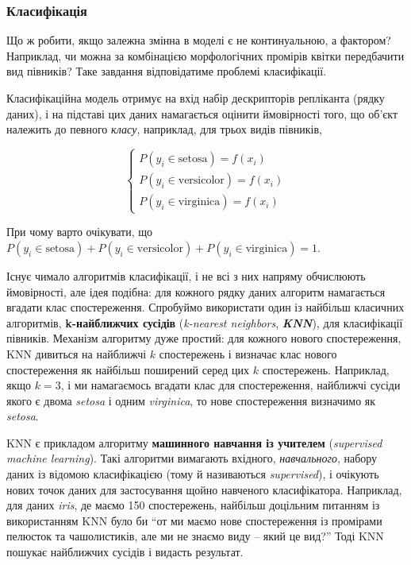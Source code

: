 \documentclass[
  11pt,
]{book}
\begin{document}
\subsubsection{Класифікація}\label{ux43aux43bux430ux441ux438ux444ux456ux43aux430ux446ux456ux44f}

Що ж робити, якщо залежна змінна в моделі є не континуальною, а фактором? Наприклад, чи можна за комбінацією морфологічних промірів квітки передбачити вид півників? Таке завдання відповідатиме проблемі класифікації.

Класифікаційна модель отримує на вхід набір дескрипторів репліканта (рядку даних), і на підставі цих даних намагається оцінити ймовірності того, що об'єкт належить до певного \emph{класу}, наприклад, для трьох видів півників,

\[
\begin{cases}
    P(y_i \in \text{setosa}) = f(x_i) \\
    P(y_i \in \text{versicolor}) = f(x_i) \\
    P(y_i \in \text{virginica}) = f(x_i)
\end{cases}
\]

При чому варто очікувати, що \(P(y_i \in \text{setosa}) + P(y_i \in \text{versicolor}) + P(y_i \in \text{virginica}) = 1\).

Існує чимало алгоритмів класифікації, і не всі з них напряму обчислюють ймовірності, але ідея подібна: для кожного рядку даних алгоритм намагається вгадати клас спостереження. Спробуймо використати один із найбільш класичних алгоритмів, \textbf{k-найближчих сусідів} (\emph{k-nearest neighbors}, \textbf{\emph{KNN}}), для класифікації півників. Механізм алгоритму дуже простий: для кожного нового спостереження, KNN дивиться на найближчі \(k\) спостережень і визначає клас нового спостереження як найбільш поширений серед цих \(k\) спостережень. Наприклад, якщо \(k=3\), і ми намагаємось вгадати клас для спостереження, найближчі сусіди якого є двома \emph{setosa} і одним \emph{virginica}, то нове спостереження визначимо як \emph{setosa}.

KNN є прикладом алгоритму \textbf{машинного навчання із учителем} (\emph{supervised machine learning}). Такі алгоритми вимагають вхідного, \emph{навчального}, набору даних із відомою класифікацією (тому й називаються \emph{supervised}), і очікують нових точок даних для застосування щойно навченого класифікатора. Наприклад, для даних \emph{iris}, де маємо 150 спостережень, найбільш доцільним питанням із використанням KNN було би ``от ми маємо нове спостереження із промірами пелюсток та чашолистиків, але ми не знаємо виду -- який це вид?'' Тоді KNN пошукає найближчих сусідів і видасть результат.
\end{document}
